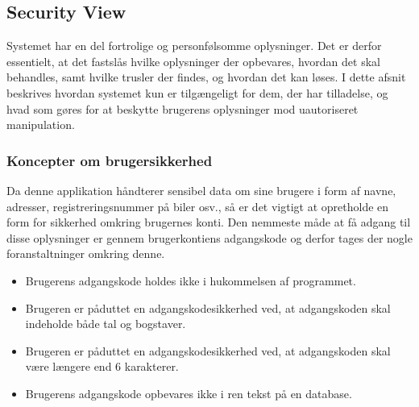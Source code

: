 \documentclass[Rapport/Rapport_main.tex]{subfiles}
\begin{document}
\subsection{Security View}
Systemet har en del fortrolige og personfølsomme oplysninger. Det er derfor essentielt, at det fastslås hvilke oplysninger der opbevares, hvordan det skal behandles, samt hvilke trusler der findes, og hvordan det kan løses. I dette afsnit beskrives hvordan systemet kun er tilgængeligt for dem, der har tilladelse, og hvad som gøres for at beskytte brugerens oplysninger mod uautoriseret manipulation.  

\subsubsection{Koncepter om brugersikkerhed}
Da denne applikation håndterer sensibel data om sine brugere i form af navne, adresser, registreringsnummer på biler osv., så er det vigtigt at opretholde en form for sikkerhed omkring brugernes konti. Den nemmeste måde at få adgang til disse oplysninger er gennem brugerkontiens adgangskode og derfor tages der nogle foranstaltninger omkring denne. \begin{itemize}
    \item Brugerens adgangskode holdes ikke i hukommelsen af programmet. 
    \item Brugeren er påduttet en adgangskodesikkerhed ved, at adgangskoden skal indeholde både tal og bogstaver.
    \item Brugeren er påduttet en adgangskodesikkerhed ved, at adgangskoden skal være længere end 6 karakterer.
    \item Brugerens adgangskode opbevares ikke i ren tekst på en database.
\end{itemize}
\end{document}
